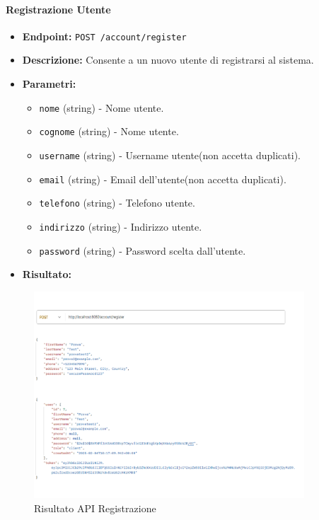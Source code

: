 \paragraph{Registrazione Utente}
\begin{itemize}
    \item \textbf{Endpoint:} \texttt{POST /account/register}
    \item \textbf{Descrizione:} Consente a un nuovo utente di registrarsi al sistema.
    \item \textbf{Parametri:}
    \begin{itemize}
        \item \texttt{nome} (string) - Nome utente.
        \item \texttt{cognome} (string) - Nome utente.
        \item \texttt{username} (string) - Username utente(non accetta duplicati).
        \item \texttt{email} (string) - Email dell'utente(non accetta duplicati).
        \item \texttt{telefono} (string) - Telefono utente.
        \item \texttt{indirizzo} (string) - Indirizzo utente.
        \item \texttt{password} (string) - Password scelta dall'utente.
    \end{itemize}
    \item \textbf{Risultato:}
\end{itemize}
\begin{figure}[H]
    \centering
    \includegraphics[width=0.9\textwidth]{images/registerapi.png}
    \caption{Risultato API Registrazione}
    \label{fig:api_register}
\end{figure}

